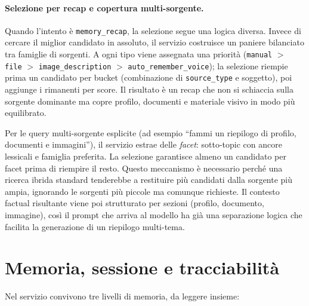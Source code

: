 \paragraph{Selezione per recap e copertura multi-sorgente.}

Quando l'intento è \texttt{memory\_recap}, la selezione segue una logica diversa. Invece di cercare il miglior candidato in assoluto, il servizio costruisce un paniere bilanciato tra famiglie di sorgenti. A ogni tipo viene assegnata una priorità (\texttt{manual} $>$ \texttt{file} $>$ \texttt{image\_description} $>$ \texttt{auto\_remember\_voice}); la selezione riempie prima un candidato per bucket (combinazione di \texttt{source\_type} e soggetto), poi aggiunge i rimanenti per score. Il risultato è un recap che non si schiaccia sulla sorgente dominante ma copre profilo, documenti e materiale visivo in modo più equilibrato.

Per le query multi-sorgente esplicite (ad esempio ``fammi un riepilogo di profilo, documenti e immagini''), il servizio estrae delle \emph{facet}: sotto-topic con ancore lessicali e famiglia preferita. La selezione garantisce almeno un candidato per facet prima di riempire il resto. Questo meccanismo è necessario perché una ricerca ibrida standard tenderebbe a restituire più candidati dalla sorgente più ampia, ignorando le sorgenti più piccole ma comunque richieste. Il contesto factual risultante viene poi strutturato per sezioni (profilo, documento, immagine), così il prompt che arriva al modello ha già una separazione logica che facilita la generazione di un riepilogo multi-tema.

\section{Memoria, sessione e tracciabilità}
Nel servizio convivono tre livelli di memoria, da leggere insieme:

